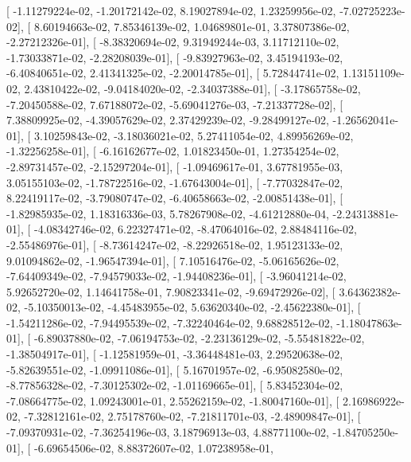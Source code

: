 \documentclass{article}
\begin{document}
       [ -1.11279224e-02,  -1.20172142e-02,   8.19027894e-02,
          1.23259956e-02,  -7.02725223e-02],
       [  8.60194663e-02,   7.85346139e-02,   1.04689801e-01,
          3.37807386e-02,  -2.27212326e-01],
       [ -8.38320694e-02,   9.31949244e-03,   3.11712110e-02,
         -1.73033871e-02,  -2.28208039e-01],
       [ -9.83927963e-02,   3.45194193e-02,  -6.40840651e-02,
          2.41341325e-02,  -2.20014785e-01],
       [  5.72844741e-02,   1.13151109e-02,   2.43810422e-02,
         -9.04184020e-02,  -2.34037388e-01],
       [ -3.17865758e-02,  -7.20450588e-02,   7.67188072e-02,
         -5.69041276e-03,  -7.21337728e-02],
       [  7.38809925e-02,  -4.39057629e-02,   2.37429239e-02,
         -9.28499127e-02,  -1.26562041e-01],
       [  3.10259843e-02,  -3.18036021e-02,   5.27411054e-02,
          4.89956269e-02,  -1.32256258e-01],
       [ -6.16162677e-02,   1.01823450e-01,   1.27354254e-02,
         -2.89731457e-02,  -2.15297204e-01],
       [ -1.09469617e-01,   3.67781955e-03,   3.05155103e-02,
         -1.78722516e-02,  -1.67643004e-01],
       [ -7.77032847e-02,   8.22419117e-02,  -3.79080747e-02,
         -6.40658663e-02,  -2.00851438e-01],
       [ -1.82985935e-02,   1.18316336e-03,   5.78267908e-02,
         -4.61212880e-04,  -2.24313881e-01],
       [ -4.08342746e-02,   6.22327471e-02,  -8.47064016e-02,
          2.88484116e-02,  -2.55486976e-01],
       [ -8.73614247e-02,  -8.22926518e-02,   1.95123133e-02,
          9.01094862e-02,  -1.96547394e-01],
       [  7.10516476e-02,  -5.06165626e-02,  -7.64409349e-02,
         -7.94579033e-02,  -1.94408236e-01],
       [ -3.96041214e-02,   5.92652720e-02,   1.14641758e-01,
          7.90823341e-02,  -9.69472926e-02],
       [  3.64362382e-02,  -5.10350013e-02,  -4.45483955e-02,
          5.63620340e-02,  -2.45622380e-01],
       [ -1.54211286e-02,  -7.94495539e-02,  -7.32240464e-02,
          9.68828512e-02,  -1.18047863e-01],
       [ -6.89037880e-02,  -7.06194753e-02,  -2.23136129e-02,
         -5.55481822e-02,  -1.38504917e-01],
       [ -1.12581959e-01,  -3.36448481e-03,   2.29520638e-02,
         -5.82639551e-02,  -1.09911086e-01],
       [  5.16701957e-02,  -6.95082580e-02,  -8.77856328e-02,
         -7.30125302e-02,  -1.01169665e-01],
       [  5.83452304e-02,  -7.08664775e-02,   1.09243001e-01,
          2.55262159e-02,  -1.80047160e-01],
       [  2.16986922e-02,  -7.32812161e-02,   2.75178760e-02,
         -7.21811701e-03,  -2.48909847e-01],
       [ -7.09370931e-02,  -7.36254196e-03,   3.18796913e-03,
          4.88771100e-02,  -1.84705250e-01],
       [ -6.69654506e-02,   8.88372607e-02,   1.07238958e-01,
\end{document}
